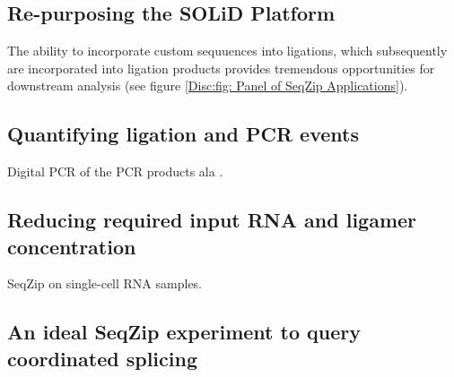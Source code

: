   \subsection{Re-purposing the SOLiD Platform}\label{Disc:subsec:SOLiD Platform for SeqZip}


    The ability to incorporate custom sequuences into ligations, which subsequently are incorporated into ligation products provides tremendous opportunities for downstream analysis (see figure \ref{Disc:fig: Panel of SeqZip Applications}).

  \subsection{Quantifying ligation and PCR events}\label{Disc:subsec:SeqZip and QPCR}

    Digital PCR of the PCR products ala \citep{Shiroguchi2012a}. 

  \subsection{Reducing required input RNA and ligamer concentration}\label{Disc:subsec:Reducing Input RNA and Ligamer Conc.}

    SeqZip on single-cell RNA samples.

  \subsection{An ideal SeqZip experiment to query coordinated splicing}\label{Disc:subsec: Ideal SeqZip exp. to look for Coordination}
    \label{Disc:subsec: Ideal multiplex study}

